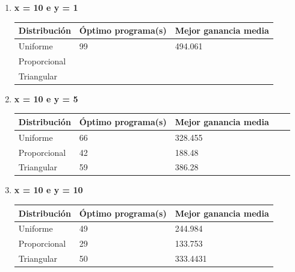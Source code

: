 \documentclass[]{article}
\begin{document}
\begin{enumerate}
	\item \textbf{ x = 10 e y = 1}
	\begin{table}[H]
		\begin{center}
			
			\begin{tabular}{|l|l|l|}
				
				\hline
				Distribución & Óptimo programa(s) & Mejor ganancia media\\
				\hline \hline
				Uniforme & 99 & 494.061
				\\ \hline
				Proporcional &  & 
				\\ \hline
				Triangular &  &
				\\ \hline
				
			\end{tabular}
			
			\label{tabla:sencilla}
		\end{center}
	\end{table}
	\item \textbf{ x = 10 e y = 5}
	\begin{table}[H]
		\begin{center}
			\begin{tabular}{|l|l|l|l|l|}
				
				\hline
				Distribución & Óptimo programa(s) & Mejor ganancia media\\
				\hline \hline
				Uniforme & 66 & 328.455
				\\ \hline
				Proporcional & 42 &  188.48
				\\ \hline
				Triangular & 59 & 386.28
				\\ \hline
				
			\end{tabular}
			
			\label{tabla:sencilla}
		\end{center}
	\end{table}
	\item \textbf{ x = 10 e y = 10}
	\begin{table}[H]
		\begin{center}
			\begin{tabular}{|l|l|l|}
				
				\hline
				Distribución & Óptimo programa(s) & Mejor ganancia media\\
				\hline \hline
				Uniforme & 49 & 244.984
				\\ \hline
				Proporcional & 29& 133.753
				\\ \hline
				Triangular & 50 & 333.4431
				\\ \hline
				
			\end{tabular}
			
			\label{tabla:sencilla}
		\end{center}
	\end{table}
\end{enumerate}




 
 
	
\end{document}
